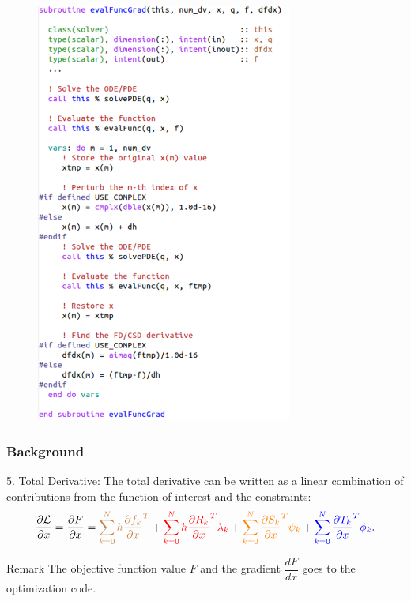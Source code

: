 \documentclass{beamer}
\newcommand{\pd}[2]{\dfrac{\partial #1}{\partial #2}}
\newcommand{\pf}[2]{\dfrac{d #1}{d #2}}
\begin{document}
\begin{frame}
{\begin{minipage}{\linewidth}
\begin{minipage}{0.49\linewidth}
\begin{figure}
          \includegraphics[trim={2pt 0 0 0}, clip,width=0.75\textwidth]{fd-csd.pdf}
        \end{figure}
      \end{minipage}
    \end{minipage}
  }
\end{frame}

\begin{frame}\frametitle{Background}\scriptsize{

    \begin{block}{5. Total Derivative:}
      The total derivative can be
      written as a \underline{linear combination} of contributions from the function
      of interest and the constraints:
      \begin{equation}\label{eqn:nbg-total-derivative}
        \pd{\cal{L}}{x} = \pd{F}{x} = 
        \textcolor{brown}{\sum_{k=0}^N h \pd{f_k}{x}^T} + 
        \textcolor{red}{\sum_{k=0}^N h \pd{R_k}{x}^T \lambda_k} + 
        \textcolor{orange}{\sum_{k=0}^N \pd{S_k}{x}^T \psi_k} + 
        \textcolor{blue}{\sum_{k=0}^N \pd{T_k}{x}^T \phi_k}.
      \end{equation}
    \end{block}
    \begin{block}{Remark}
      The objective function value $F$ and the gradient $\pf{F}{x}$ goes
      to the optimization code.
    \end{block}
  }
\end{frame}
\end{document}

